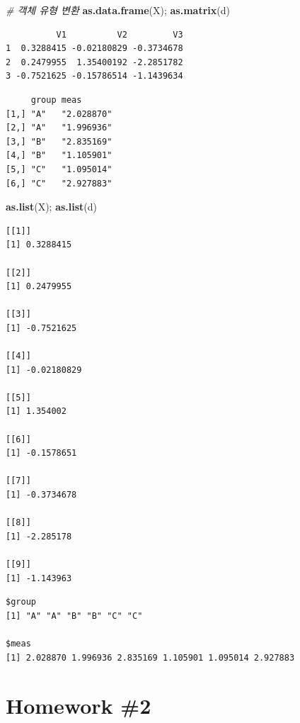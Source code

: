 \documentclass[
  11pt,
]{krantz}
\newenvironment{Shaded}{\begin{snugshade}}{\end{snugshade}}
\newcommand{\CommentTok}[1]{\textcolor[rgb]{0.37,0.37,0.37}{\textit{#1}}}
\newcommand{\KeywordTok}[1]{\textcolor[rgb]{0.27,0.27,0.27}{\textbf{#1}}}
\newcommand{\NormalTok}[1]{#1}
\begin{document}
\begin{Shaded}
\begin{Highlighting}[]
\CommentTok{# 객체 유형 변환}
\KeywordTok{as.data.frame}\NormalTok{(X); }\KeywordTok{as.matrix}\NormalTok{(d)}
\end{Highlighting}
\end{Shaded}

\begin{verbatim}
          V1          V2         V3
1  0.3288415 -0.02180829 -0.3734678
2  0.2479955  1.35400192 -2.2851782
3 -0.7521625 -0.15786514 -1.1439634
\end{verbatim}

\begin{verbatim}
     group meas      
[1,] "A"   "2.028870"
[2,] "A"   "1.996936"
[3,] "B"   "2.835169"
[4,] "B"   "1.105901"
[5,] "C"   "1.095014"
[6,] "C"   "2.927883"
\end{verbatim}

\begin{Shaded}
\begin{Highlighting}[]
\KeywordTok{as.list}\NormalTok{(X); }\KeywordTok{as.list}\NormalTok{(d)}
\end{Highlighting}
\end{Shaded}

\begin{verbatim}
[[1]]
[1] 0.3288415

[[2]]
[1] 0.2479955

[[3]]
[1] -0.7521625

[[4]]
[1] -0.02180829

[[5]]
[1] 1.354002

[[6]]
[1] -0.1578651

[[7]]
[1] -0.3734678

[[8]]
[1] -2.285178

[[9]]
[1] -1.143963
\end{verbatim}

\begin{verbatim}
$group
[1] "A" "A" "B" "B" "C" "C"

$meas
[1] 2.028870 1.996936 2.835169 1.105901 1.095014 2.927883
\end{verbatim}

\normalsize

\hypertarget{homework-2}{%
\section{Homework \#2}\label{homework-2}}
\end{document}
